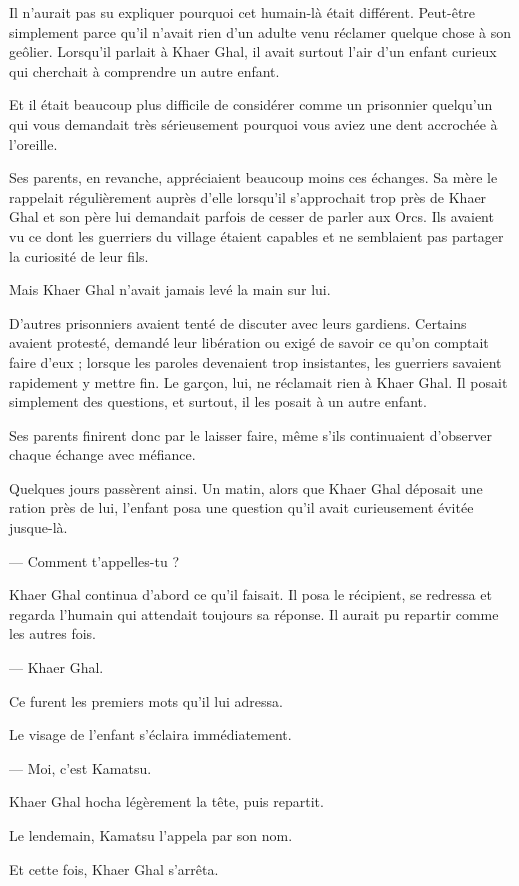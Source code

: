 Il n'aurait pas su expliquer pourquoi cet humain-là était différent. Peut-être
simplement parce qu'il n'avait rien d'un adulte venu réclamer quelque chose à
son geôlier. Lorsqu'il parlait à Khaer Ghal, il avait surtout l'air d'un enfant
curieux qui cherchait à comprendre un autre enfant.

Et il était beaucoup plus difficile de considérer comme un prisonnier
quelqu'un qui vous demandait très sérieusement pourquoi vous aviez une dent
accrochée à l'oreille.

Ses parents, en revanche, appréciaient beaucoup moins ces échanges. Sa mère le
rappelait régulièrement auprès d'elle lorsqu'il s'approchait trop près de Khaer
Ghal et son père lui demandait parfois de cesser de parler aux Orcs. Ils avaient
vu ce dont les guerriers du village étaient capables et ne semblaient pas
partager la curiosité de leur fils.

Mais Khaer Ghal n'avait jamais levé la main sur lui.

D'autres prisonniers avaient tenté de discuter avec leurs gardiens. Certains
avaient protesté, demandé leur libération ou exigé de savoir ce qu'on comptait
faire d'eux ; lorsque les paroles devenaient trop insistantes, les guerriers
savaient rapidement y mettre fin. Le garçon, lui, ne réclamait rien à Khaer
Ghal. Il posait simplement des questions, et surtout, il les posait à un autre
enfant.

Ses parents finirent donc par le laisser faire, même s'ils continuaient
d'observer chaque échange avec méfiance.

Quelques jours passèrent ainsi. Un matin, alors que Khaer Ghal déposait une
ration près de lui, l'enfant posa une question qu'il avait curieusement évitée
jusque-là.

— Comment t'appelles-tu ?

Khaer Ghal continua d'abord ce qu'il faisait. Il posa le récipient, se redressa
et regarda l'humain qui attendait toujours sa réponse. Il aurait pu repartir
comme les autres fois.

— Khaer Ghal.

Ce furent les premiers mots qu'il lui adressa.

Le visage de l'enfant s'éclaira immédiatement.

— Moi, c'est Kamatsu.

Khaer Ghal hocha légèrement la tête, puis repartit.

Le lendemain, Kamatsu l'appela par son nom.

Et cette fois, Khaer Ghal s'arrêta.

